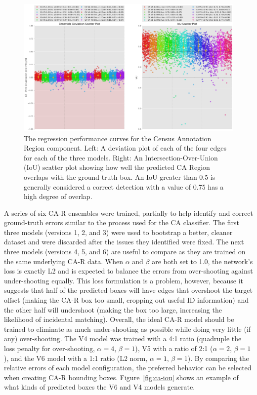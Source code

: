 \begin{figure}[!t]
    \begin{center}
        \includegraphics[width=0.90\linewidth]{resources/ca-census-regions.pdf}
    \end{center}
    \caption{The regression performance curves for the Census Annotation Region component.  Left: A deviation plot of each of the four edges for each of the three models.  Right: An Intersection-Over-Union (IoU) scatter plot showing how well the predicted CA Region overlaps with the ground-truth box.  An IoU greater than 0.5 is generally considered a correct detection with a value of 0.75 has a high degree of overlap.}
    \label{fig:ca-census_regression}
\end{figure}

A series of six CA-R ensembles were trained, partially to help identify and correct ground-truth errors similar to the process used for the CA classifier.  The first three models (versions 1, 2, and 3) were used to bootstrap a better, cleaner dataset and were discarded after the issues they identified were fixed.  The next three models (versions 4, 5, and 6) are useful to compare as they are trained on the same underlying CA-R data.  When $\alpha$ and $\beta$ are both set to 1.0, the network's loss is exactly L2 and is expected to balance the errors from over-shooting against under-shooting equally.  This loss formulation is a problem, however, because it suggests that half of the predicted boxes will have edges that overshoot the target offset (making the CA-R box too small, cropping out useful ID information) and the other half will undershoot (making the box too large, increasing the likelihood of incidental matching).  Overall, the ideal CA-R model should be trained to eliminate as much under-shooting as possible while doing very little (if any) over-shooting.  The V4 model was trained with a 4:1 ratio (quadruple the loss penalty for over-shooting, $\alpha=4$, $\beta=1$), V5 with a ratio of 2:1 ($\alpha=2$, $\beta=1$), and the V6 model with a 1:1 ratio (L2 norm, $\alpha=1$, $\beta=1$).  By comparing the relative errors of each model configuration, the preferred behavior can be selected when creating CA-R bounding boxes.  Figure~\ref{fig:ca-iou} shows an example of what kinds of predicted boxes the V6 and V4 models generate.


